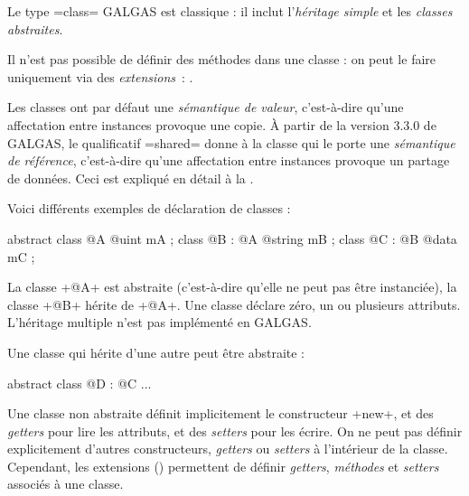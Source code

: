

Le type \ggs=class= GALGAS est classique : il inclut l'\emph{héritage simple} et les \emph{classes abstraites}.

Il n'est pas possible de définir des méthodes dans une classe : on peut le faire uniquement via des \emph{extensions}~: .

Les classes ont par défaut une \emph{sémantique de valeur}, c'est-à-dire qu'une affectation entre instances provoque une copie. À partir de la version 3.3.0 de GALGAS, le qualificatif \ggs=shared= donne à la classe qui le porte une \emph{sémantique de référence}, c'est-à-dire qu'une affectation entre instances provoque un partage de données. Ceci est expliqué en détail à la .










Voici différents exemples de déclaration de classes :

\begin{galgas}
abstract class @A {
  @uint mA ;
}
class @B : @A {
  @string mB ;
}
class @C : @B {
  @data mC ;
}
\end{galgas}

La classe \ggs+@A+ est abstraite (c'est-à-dire qu'elle ne peut pas être instanciée), la classe \ggs+@B+ hérite de \ggs+@A+. Une classe déclare zéro, un ou plusieurs attributs. L'héritage multiple n'est pas implémenté en GALGAS.

Une classe qui hérite d'une autre peut être abstraite :
\begin{galgas}
abstract class @D : @C {
  ...
 }
\end{galgas}

Une classe non abstraite définit implicitement le constructeur \ggs+new+, et des \emph{getters} pour lire les attributs, et des \emph{setters} pour les écrire. On ne peut pas définir explicitement d'autres constructeurs, \emph{getters} ou \emph{setters} à l'intérieur de la classe. Cependant,  les extensions () permettent de définir \emph{getters}, \emph{méthodes} et \emph{setters} associés à une classe.












